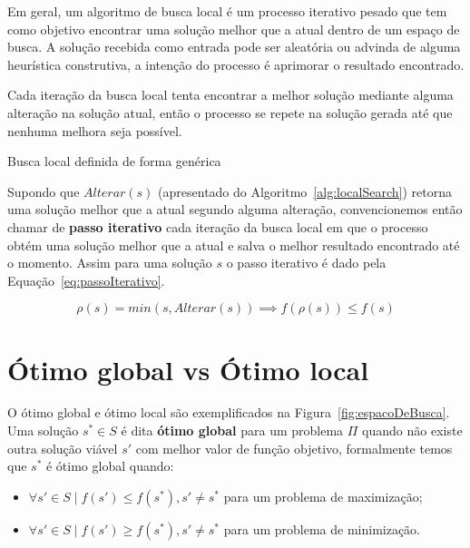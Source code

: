 Em geral, um algoritmo de busca local é um processo iterativo pesado que tem como objetivo encontrar uma solução melhor que a atual dentro de um espaço de busca.
A solução recebida como entrada pode ser aleatória ou advinda de alguma heurística construtiva, a intenção do processo é aprimorar o resultado encontrado.

Cada iteração da busca local tenta encontrar a melhor solução mediante alguma alteração na solução atual, então o processo se repete na solução gerada até que nenhuma melhora seja possível.

\begin{algorithm}[htpb]
\caption{Busca local definida de forma genérica}
\label{alg:localSearch}
\begin{algorithmic}[1]
         
        \EndWhile
         
    \EndFunction
\end{algorithmic}
\end{algorithm}

Supondo que $Alterar(s)$ (apresentado do Algoritmo~\ref{alg:localSearch}) retorna uma solução melhor que a atual segundo alguma alteração, convencionemos então chamar de \textbf{passo iterativo} cada iteração da busca local em que o processo obtém uma solução melhor que a atual e salva o melhor resultado encontrado até o momento.
Assim para uma solução $s$ o passo iterativo é dado pela Equação~\ref{eq:passoIterativo}.

\begin{equation} \label{eq:passoIterativo}
\rho(s) = min(s, Alterar(s)) \implies f(\rho(s)) \le f(s)
\end{equation}

\section{Ótimo global vs Ótimo local} \label{sec:otimoLocalGlobal}

O ótimo global e ótimo local são exemplificados na Figura~\ref{fig:espacoDeBusca}.
Uma solução $s^* \in S$ é dita \textbf{ótimo global} para um problema $\Pi$ quando não existe outra solução viável $s'$ com melhor valor de função objetivo, formalmente temos que $s^*$ é ótimo global quando:
\begin{itemize}
    \item $\forall s' \in S \mid f(s') \le f(s^*), s' \neq s^* $ para um problema de maximização;
    \item $\forall s' \in S \mid f(s') \ge f(s^*), s' \neq s^* $ para um problema de minimização.
\end{itemize}


